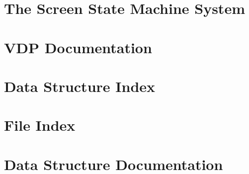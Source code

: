 \documentclass[twoside]{book}
\newcommand{\+}{\discretionary{\mbox{\scriptsize$\hookleftarrow$}}{}{}}
\begin{document}
\chapter{The Screen State Machine System}
\label{md_docs_pages_screens}

\chapter{VDP Documentation}
\label{md_docs_pages_vdp}

\chapter{Data Structure Index}

\chapter{File Index}

\chapter{Data Structure Documentation}













\end{document}
